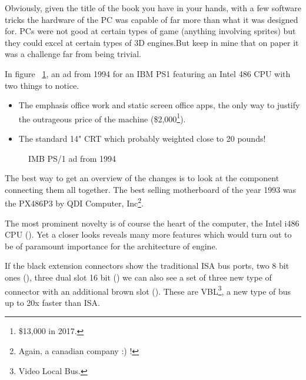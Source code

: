 \par
Obviously, given the title of the book you have in your hands, with a few software tricks the hardware of the PC was capable of far more than what it was designed for. PCs were not good at certain types of game (anything involving sprites) but they could excel at certain types of 3D engines.But keep in mine that on paper it was a challenge far from being trivial.\\
\par

In figure ~\ref{ibm_ps1_top}, an ad from 1994 for an IBM PS1 featuring an Intel 486 CPU with two things to notice.
\begin{itemize}
\item The emphasis office work and static screen office apps, the only way to justify the outrageous price of the machine (\$2,000\footnote{\$13,000 in 2017.}). 
\item The standard 14" CRT which probably weighted close to 20 pounds!\\
\end{itemize}
\par
\vspace{2 in}
\par
\begin{figure}[H] \centering
{}
\caption{IMB PS/1 ad from 1994}
\label{ibm_ps1_top}
\end{figure}


















\cleartoleftpage
 
The best way to get an overview of the changes is to look at the component connecting them all together. The best selling motherboard of the year 1993 was the PX486P3 by QDI Computer, Inc\footnote{Again, a canadian company :) !}.\\

\par
The most prominent novelty is of course the heart of the computer, the Intel i486 CPU (). Yet a closer looks reveals many more features which would turn out to be of paramount importance for the architecture of \doom engine.\\
\par 
If the black extension connectors show the traditional ISA bus ports, two 8 bit ones (), three dual slot 16 bit () we can also see a set of three new type of connector with an additional brown slot (). These are VBL\footnote{Video Local Bus.}, a new type of bus up to 20x faster than ISA.

